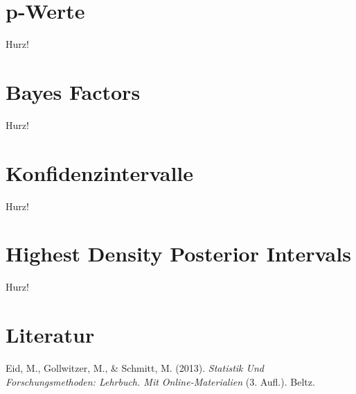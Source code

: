 \documentclass[
  letterpaper,
  DIV=11]{scrreprt}
\newlength{\cslhangindent}
\newenvironment{CSLReferences}[2] %
 {\begin{list}{}{%
  \setlength{\itemindent}{0pt}
  \setlength{\leftmargin}{0pt}
  \setlength{\parsep}{0pt}
  \ifodd #1
   \setlength{\leftmargin}{\cslhangindent}
   \setlength{\itemindent}{-1\cslhangindent}
  \fi
  \setlength{\itemsep}{#2\baselineskip}}}
 {\end{list}}
\begin{document}

\chapter{p-Werte}\label{sec-p-Werte}

Hurz!


\chapter{Bayes Factors}\label{sec-Bayes}

Hurz!


\chapter{Konfidenzintervalle}\label{sec-Konfidenzintervalle}

Hurz!


\chapter{Highest Density Posterior Intervals}\label{sec-Highest}

Hurz!


\chapter*{Literatur}\label{literatur}


\label{refs}
\begin{CSLReferences}{1}{0}
Eid, M., Gollwitzer, M., \& Schmitt, M. (2013). \emph{Statistik Und
{Forschungsmethoden}: {Lehrbuch}. {Mit Online-Materialien}} (3. Aufl.).
{Beltz}.

\end{CSLReferences}
\end{document}
